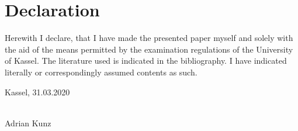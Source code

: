 \chapter*{Declaration}

Herewith I declare, that I have made the presented paper myself and solely
with the aid of the means permitted by the examination regulations of the
University of Kassel.
The literature used is indicated in the bibliography.
I have indicated literally or correspondingly assumed contents as such.

\vspace{1cm}

Kassel, 31.03.2020

\begin{flushright}
  \underline{\hspace{7cm}} \\
  Adrian Kunz
\end{flushright}
